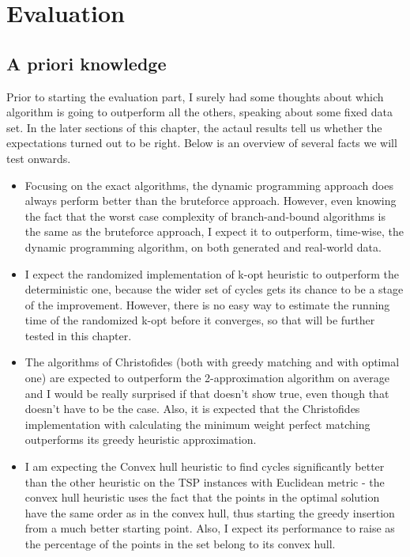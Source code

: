 \documentclass[12pt,twoside,notitlepage]{report}
\begin{document}
\cleardoublepage
\chapter{Evaluation}

\section{A priori knowledge}

Prior to starting the evaluation part, I surely had some thoughts about which algorithm is going to outperform all the others, speaking about some fixed data set. In the later sections of this chapter, the actaul results tell us whether the expectations turned out to be right. Below is an overview of several facts we will test onwards.

\begin{itemize}

\item Focusing on the exact algorithms, the dynamic programming approach does always perform better than the bruteforce approach. However, even knowing the fact that the worst case complexity of branch-and-bound algorithms is the same as the bruteforce approach, I expect it to outperform, time-wise, the dynamic programming algorithm, on both generated and real-world data.

\item I expect the randomized implementation of k-opt heuristic to outperform the deterministic one, because the wider set of cycles gets its chance to be a stage of the improvement. However, there is no easy way to estimate the running time of the randomized k-opt before it converges, so that will be further tested in this chapter. 

\item The algorithms of Christofides (both with greedy matching and with optimal one) are expected to outperform the 2-approximation algorithm on average and I would be really surprised if that doesn't show true, even though that doesn't have to be the case. Also, it is expected that the Christofides implementation with calculating the minimum weight perfect matching outperforms its greedy heuristic approximation.

\item I am expecting the Convex hull heuristic to find cycles significantly better than the other heuristic on the TSP instances with Euclidean metric - the convex hull heuristic uses the fact that the points in the optimal solution have the same order as in the convex hull, thus starting the greedy insertion from a much better starting point. Also, I expect its performance to raise as the percentage of the points in the set belong to its convex hull.


\end{itemize}
\end{document}
